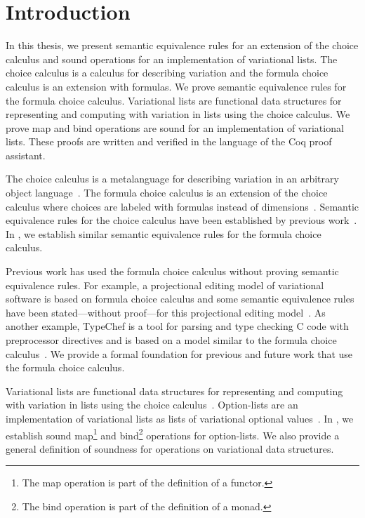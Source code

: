 \chapter{Introduction}
\label{ch:intro}

In this thesis, we present semantic equivalence rules for an extension of the choice calculus and sound operations for an implementation of variational lists.
The choice calculus is a calculus for describing variation and the formula choice calculus is an extension with formulas.
We prove semantic equivalence rules for the formula choice calculus.
Variational lists are functional data structures for representing and computing with variation in lists using the choice calculus.
We prove map and bind operations are sound for an implementation of variational lists.
These proofs are written and verified in the language of the Coq proof assistant.

The choice calculus is a metalanguage for describing variation in an arbitrary object language~\citep{EW11tosem}.
The formula choice calculus is an extension of the choice calculus where choices are labeled with formulas instead of dimensions~\citep{WO14gpce}.
Semantic equivalence rules for the choice calculus have been established by previous work~\citep{Walk13thesis}.
In , we establish similar semantic equivalence rules for the formula choice calculus.

Previous work has used the formula choice calculus without proving semantic equivalence rules.
For example, a projectional editing model of variational software is based on formula choice calculus and some semantic equivalence rules have been stated---without proof---for this projectional editing model~\citep{WO14gpce}.
As another example, TypeChef is a tool for parsing and type checking C code with preprocessor directives and is based on a model similar to the formula choice calculus~\citep{Ken10,Kas11,Walk14onward}.
We provide a formal foundation for previous and future work that use the formula choice calculus.

Variational lists are functional data structures for representing and computing with variation in lists using the choice calculus~\citep{WE12gpce}.
Option-lists are an implementation of variational lists as lists of variational optional values~\citep{Walk14onward}.
In , we establish sound map\footnote{The map operation is part of the definition of a functor.} and bind\footnote{The bind operation is part of the definition of a monad.} operations for option-lists.
We also provide a general definition of soundness for operations on variational data structures.

